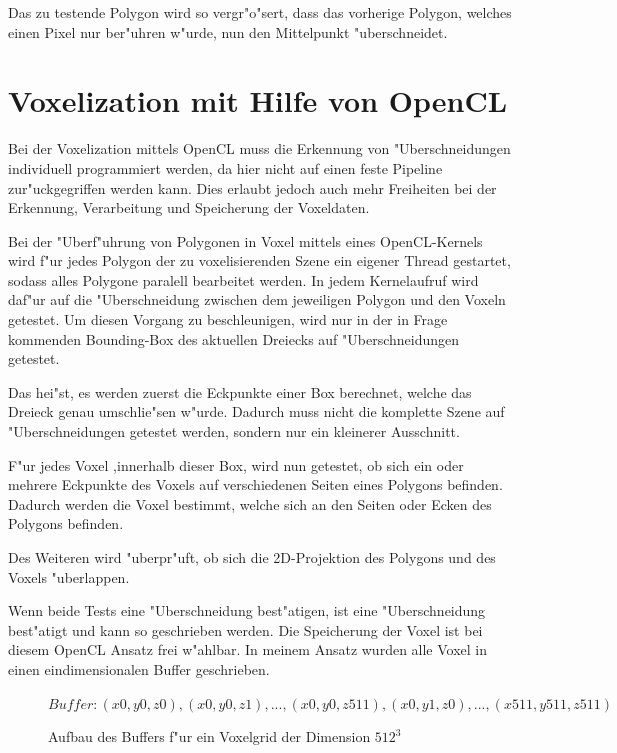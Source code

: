 \documentclass[a4paper, 12pt]{scrartcl}
\begin{document}
Das zu testende Polygon wird so vergr"o"sert, dass das vorherige Polygon, welches einen Pixel nur ber"uhren w"urde, nun den Mittelpunkt "uberschneidet. 

\newpage

\section{Voxelization mit Hilfe von OpenCL}
Bei der Voxelization mittels OpenCL muss die Erkennung von "Uberschneidungen individuell programmiert werden, da hier nicht auf einen feste Pipeline zur"uckgegriffen werden kann. Dies erlaubt jedoch auch mehr Freiheiten bei der Erkennung, Verarbeitung und Speicherung der Voxeldaten. 

Bei der "Uberf"uhrung von Polygonen in Voxel mittels eines OpenCL-Kernels wird f"ur jedes Polygon der zu voxelisierenden Szene ein eigener Thread gestartet, sodass alles Polygone paralell bearbeitet werden. 
In jedem Kernelaufruf wird daf"ur auf die "Uberschneidung zwischen dem jeweiligen Polygon und den Voxeln getestet. Um diesen Vorgang zu beschleunigen, wird nur in der in Frage kommenden Bounding-Box des aktuellen Dreiecks auf "Uberschneidungen getestet.

Das hei"st, es werden zuerst die Eckpunkte einer Box berechnet, welche das Dreieck genau umschlie"sen w"urde. Dadurch muss nicht die komplette Szene auf "Uberschneidungen getestet werden, sondern nur ein kleinerer Ausschnitt.

F"ur jedes Voxel ,innerhalb dieser Box, wird nun getestet, ob sich ein oder mehrere Eckpunkte des Voxels auf verschiedenen Seiten eines Polygons befinden. Dadurch werden die Voxel bestimmt, welche sich an den Seiten oder Ecken des Polygons befinden.


Des Weiteren wird "uberpr"uft, ob sich die 2D-Projektion des Polygons und des Voxels "uberlappen. 

Wenn beide Tests eine "Uberschneidung best"atigen, ist eine "Uberschneidung best"atigt und kann so geschrieben werden.
Die Speicherung der Voxel ist bei diesem OpenCL Ansatz frei w"ahlbar. 
In meinem Ansatz wurden alle Voxel in einen eindimensionalen Buffer geschrieben. 

\begin{figure}
		$Buffer: (x0, y0, z0), (x0, y0, z1), ..., (x0, y0, z511), (x0, y1, z0), ..., (x511, y511, z511)$
\caption{Aufbau des Buffers f"ur ein Voxelgrid der Dimension $512^3$}

\end{figure}
\end{document}
